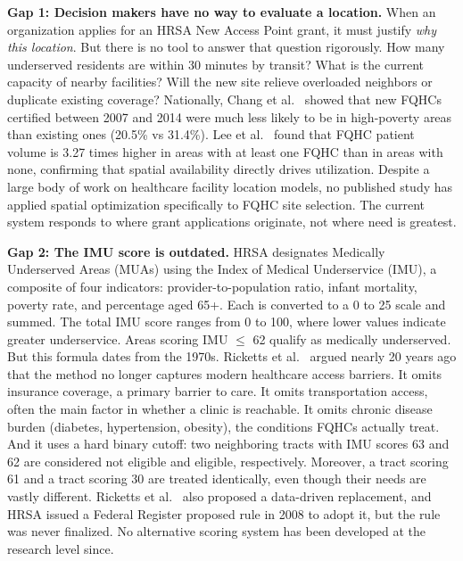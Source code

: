 \documentclass[11pt]{article}
\begin{document}
\medskip

\label{gap:location}\textbf{Gap 1: Decision makers have no way to evaluate a location.} When an organization applies for an 
HRSA New Access Point grant, it must justify \emph{why this location}. But there is no tool to answer that 
question rigorously. How many underserved residents are within 30 minutes by transit? What is the current 
capacity of nearby facilities? Will the new site relieve overloaded neighbors or duplicate existing coverage? 
Nationally, Chang et al.~\cite{chang2019geographic} showed that new FQHCs certified between 2007 and 2014 
were much less likely to be in high-poverty areas than existing ones (20.5\% vs 31.4\%). Lee et al.~\cite{lee2023spatial} found that
FQHC patient volume is 3.27 times higher in areas
with at least one FQHC than in areas with none,
confirming that spatial availability directly drives
utilization. Despite a large body of work on healthcare facility
location models, no published study has applied
spatial optimization specifically to FQHC site
selection. The current system responds to where
grant applications originate, not where need is
greatest.

\medskip

\label{gap:imu}\textbf{Gap 2: The IMU score is outdated.} HRSA designates Medically Underserved Areas (MUAs) using the 
Index of Medical Underservice (IMU), a composite of four indicators: provider-to-population ratio, infant 
mortality, poverty rate, and percentage aged 65+. Each is converted to a 0 to 25 scale and summed. The 
total IMU score ranges from 0 to 100, where lower values indicate greater underservice. Areas scoring IMU 
$\leq$ 62 qualify as medically underserved. But this formula dates from the 1970s. Ricketts et 
al.~\cite{ricketts2007designating} argued nearly 20 years ago that the method no longer captures 
modern healthcare access barriers. It omits insurance coverage, a primary barrier to care. It omits 
transportation access, often the main factor in
whether a clinic is reachable. It omits chronic 
disease burden (diabetes, hypertension, obesity), the conditions FQHCs actually treat. And it uses a hard 
binary cutoff: two neighboring tracts with IMU scores 63 and 62 are considered not eligible and eligible, 
respectively. Moreover, a tract scoring 61 and a tract scoring 30 are treated identically, even though their 
needs are vastly different. Ricketts et
al.~\cite{ricketts2007designating} also proposed a
data-driven replacement, and HRSA issued a Federal
Register proposed rule in 2008 to adopt it, but the
rule was never finalized. No alternative scoring
system has been developed at the research level
since.
\end{document}
